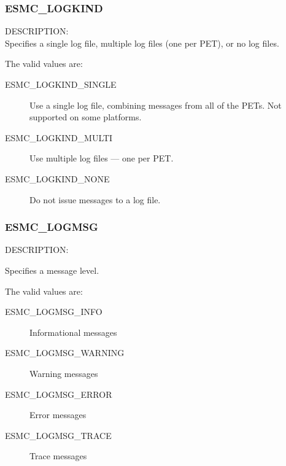 

\subsubsection{ESMC\_LOGKIND}
\label{const:clogkindflag}

{\sf DESCRIPTION:\\}
Specifies a single log file, multiple log files (one per PET), or no log files.

The valid values are:
\begin{description}
   \item [ESMC\_LOGKIND\_SINGLE] 
         Use a single log file, combining messages from all of the PETs.  Not supported on some platforms.
   \item [ESMC\_LOGKIND\_MULTI]
         Use multiple log files --- one per PET.
   \item [ESMC\_LOGKIND\_NONE]
         Do not issue messages to a log file.
\end{description}


\subsubsection{ESMC\_LOGMSG}
\label{const:clogmsgflag}

{\sf DESCRIPTION:\\}
\begin{sloppypar}
Specifies a message level.
\end{sloppypar}

The valid values are:
\begin{description}
   \item [ESMC\_LOGMSG\_INFO] 
         Informational messages
   \item [ESMC\_LOGMSG\_WARNING]
         Warning messages
   \item [ESMC\_LOGMSG\_ERROR]
         Error messages
   \item [ESMC\_LOGMSG\_TRACE]
         Trace messages
\end{description}
